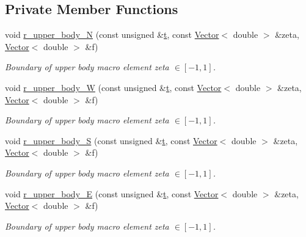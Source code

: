 \subsection*{Private Member Functions}
\begin{DoxyCompactItemize}
\item 
void \hyperlink{classoomph_1_1FishDomain_a45f1d71d2cf6f4102486b04362ba8b0b}{r\+\_\+upper\+\_\+body\+\_\+N} (const unsigned \&\hyperlink{cfortran_8h_af6f0bd3dc13317f895c91323c25c2b8f}{t}, const \hyperlink{classoomph_1_1Vector}{Vector}$<$ double $>$ \&zeta, \hyperlink{classoomph_1_1Vector}{Vector}$<$ double $>$ \&f)
\begin{DoxyCompactList}\small\item\em Boundary of upper body macro element zeta $ \in [-1,1] $. \end{DoxyCompactList}\item 
void \hyperlink{classoomph_1_1FishDomain_ac0fadb2212e194bfe9f2ff7f0c892c22}{r\+\_\+upper\+\_\+body\+\_\+W} (const unsigned \&\hyperlink{cfortran_8h_af6f0bd3dc13317f895c91323c25c2b8f}{t}, const \hyperlink{classoomph_1_1Vector}{Vector}$<$ double $>$ \&zeta, \hyperlink{classoomph_1_1Vector}{Vector}$<$ double $>$ \&f)
\begin{DoxyCompactList}\small\item\em Boundary of upper body macro element zeta $ \in [-1,1] $. \end{DoxyCompactList}\item 
void \hyperlink{classoomph_1_1FishDomain_af30cc8b5bc73f1d2e71099c19b2a0d98}{r\+\_\+upper\+\_\+body\+\_\+S} (const unsigned \&\hyperlink{cfortran_8h_af6f0bd3dc13317f895c91323c25c2b8f}{t}, const \hyperlink{classoomph_1_1Vector}{Vector}$<$ double $>$ \&zeta, \hyperlink{classoomph_1_1Vector}{Vector}$<$ double $>$ \&f)
\begin{DoxyCompactList}\small\item\em Boundary of upper body macro element zeta $ \in [-1,1] $. \end{DoxyCompactList}\item 
void \hyperlink{classoomph_1_1FishDomain_a47bdf57eebfa025628e70da2a1ab9e19}{r\+\_\+upper\+\_\+body\+\_\+E} (const unsigned \&\hyperlink{cfortran_8h_af6f0bd3dc13317f895c91323c25c2b8f}{t}, const \hyperlink{classoomph_1_1Vector}{Vector}$<$ double $>$ \&zeta, \hyperlink{classoomph_1_1Vector}{Vector}$<$ double $>$ \&f)
\begin{DoxyCompactList}\small\item\em Boundary of upper body macro element zeta $ \in [-1,1] $. \end{DoxyCompactList}\item 

\end{DoxyCompactItemize}
